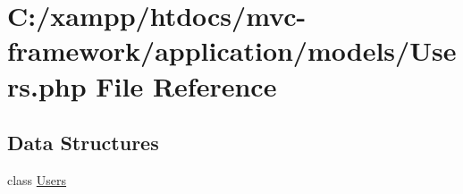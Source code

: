 \hypertarget{_users_8php}{}\section{C\+:/xampp/htdocs/mvc-\/framework/application/models/\+Users.php File Reference}
\label{_users_8php}
\subsection*{Data Structures}
\begin{DoxyCompactItemize}
\item 
class \hyperlink{class_users}{Users}
\end{DoxyCompactItemize}
